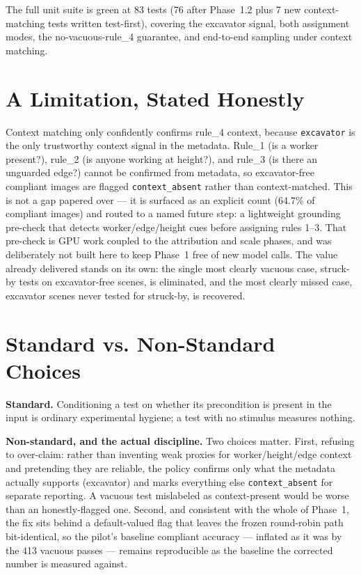 The full unit suite is green at 83 tests (76 after Phase~1.2 plus 7 new context-matching tests written
test-first), covering the excavator signal, both assignment modes, the no-vacuous-rule\_4 guarantee,
and end-to-end sampling under context matching.

\section{A Limitation, Stated Honestly}

Context matching only confidently confirms rule\_4 context, because \texttt{excavator} is the only
trustworthy context signal in the metadata. Rule\_1 (is a worker present?), rule\_2 (is anyone working
at height?), and rule\_3 (is there an unguarded edge?) cannot be confirmed from metadata, so
excavator-free compliant images are flagged \texttt{context\_absent} rather than context-matched. This
is not a gap papered over --- it is surfaced as an explicit count (64.7\% of compliant images) and
routed to a named future step: a lightweight grounding pre-check that detects worker/edge/height cues
before assigning rules 1--3. That pre-check is GPU work coupled to the attribution and scale phases,
and was deliberately not built here to keep Phase~1 free of new model calls. The value already
delivered stands on its own: the single most clearly vacuous case, struck-by tests on excavator-free
scenes, is eliminated, and the most clearly missed case, excavator scenes never tested for struck-by,
is recovered.

\section{Standard vs. Non-Standard Choices}

\textbf{Standard.} Conditioning a test on whether its precondition is present in the input is ordinary
experimental hygiene; a test with no stimulus measures nothing.

\textbf{Non-standard, and the actual discipline.} Two choices matter. First, refusing to over-claim:
rather than inventing weak proxies for worker/height/edge context and pretending they are reliable, the
policy confirms only what the metadata actually supports (excavator) and marks everything else
\texttt{context\_absent} for separate reporting. A vacuous test mislabeled as context-present would be
worse than an honestly-flagged one. Second, and consistent with the whole of Phase~1, the fix sits
behind a default-valued flag that leaves the frozen round-robin path bit-identical, so the pilot's
baseline compliant accuracy --- inflated as it was by the 413 vacuous passes --- remains reproducible
as the baseline the corrected number is measured against.

